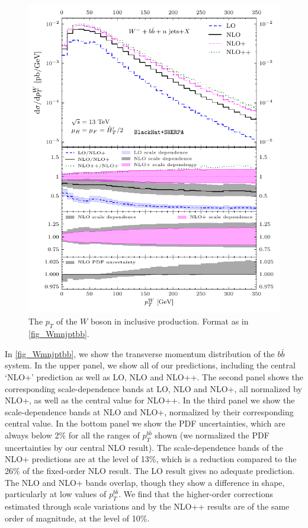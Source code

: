 \begin{figure}[ht]
  \centering
  \includegraphics[clip,scale=1]{plots/excl_ptw_v4}
  \caption{The $p_T$ of the $W$ boson in inclusive \Wbbm{} production. Format as in \cref{fig_Wmnjptbb}.}
  \label{fig_Wmnjptw}
\end{figure}

In \cref{fig_Wmnjptbb}, we show the transverse momentum distribution of
the $b\bar b$ system. In the upper panel, we show all of our predictions, including the central `NLO+' prediction as well as LO, NLO
and NLO++. The second panel shows the corresponding scale-dependence bands at
LO, NLO and NLO+, all normalized by NLO+, as well as the central value for
NLO++. In the third panel we show the scale-dependence bands at
NLO and NLO+, normalized by their corresponding central value. In the bottom panel we show the PDF uncertainties, which are always below
2\% for all the ranges of $p_T^{b\bar b}$ shown (we normalized the PDF
uncertainties by our central NLO result). The scale-dependence bands
of the NLO+ predictions are at the level of 13\%, which is a reduction compared to the 26\%
of the fixed-order NLO result. The LO result gives no adequate
prediction. The NLO and NLO+ bands overlap, though they show a difference in
shape, particularly at low values of $p_T^{b\bar b}$. We find that the
higher-order corrections estimated through scale variations and by the NLO++
results are of the same order of magnitude, at the level of 10\%.

